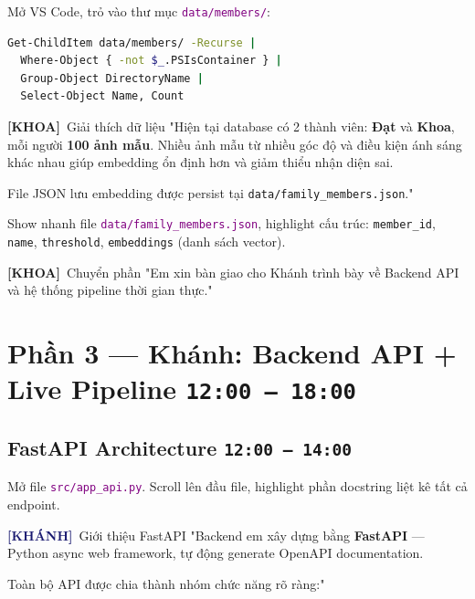 \documentclass[12pt, a4paper]{article}
\newcommand{\timing}[1]{%
  \hfill\colorbox{NavyBlue!20}{\texttt{\small #1}}%
}
\newcommand{\khanh}{\textcolor{MidnightBlue}{\textbf{[KHÁNH]}}}
\newcommand{\khoa}{\textcolor{OliveGreen}{\textbf{[KHOA]}}}
\newcommand{\fpath}[1]{\texttt{\textcolor{purple}{#1}}}
\begin{document}
\begin{action}
Mở VS Code, trỏ vào thư mục \fpath{data/members/}:
\begin{lstlisting}[language=bash]
Get-ChildItem data/members/ -Recurse |
  Where-Object { -not $_.PSIsContainer } |
  Group-Object DirectoryName |
  Select-Object Name, Count
\end{lstlisting}
\end{action}

\begin{dialog}{\khoa\ Giải thích dữ liệu}
"Hiện tại database có 2 thành viên: \textbf{Đạt} và \textbf{Khoa},
mỗi người \textbf{100 ảnh mẫu}.
Nhiều ảnh mẫu từ nhiều góc độ và điều kiện ánh sáng khác nhau
giúp embedding ổn định hơn và giảm thiểu nhận diện sai.

File JSON lưu embedding được persist tại
\texttt{data/family\_members.json}."
\end{dialog}

\begin{action}
Show nhanh file \fpath{data/family\_members.json},
highlight cấu trúc: \texttt{member\_id}, \texttt{name}, \texttt{threshold}, \texttt{embeddings} (danh sách vector).
\end{action}

\begin{dialog}{\khoa\ Chuyển phần}
"Em xin bàn giao cho Khánh trình bày về Backend API
và hệ thống pipeline thời gian thực."
\end{dialog}

\section{Phần 3 — Khánh: Backend API + Live Pipeline \timing{12:00 – 18:00}}

\subsection{FastAPI Architecture \timing{12:00 – 14:00}}

\begin{action}
Mở file \fpath{src/app\_api.py}. Scroll lên đầu file,
highlight phần docstring liệt kê tất cả endpoint.
\end{action}

\begin{dialog}{\khanh\ Giới thiệu FastAPI}
"Backend em xây dựng bằng \textbf{FastAPI} ---
Python async web framework, tự động generate OpenAPI documentation.

Toàn bộ API được chia thành nhóm chức năng rõ ràng:"
\end{dialog}
\end{document}
